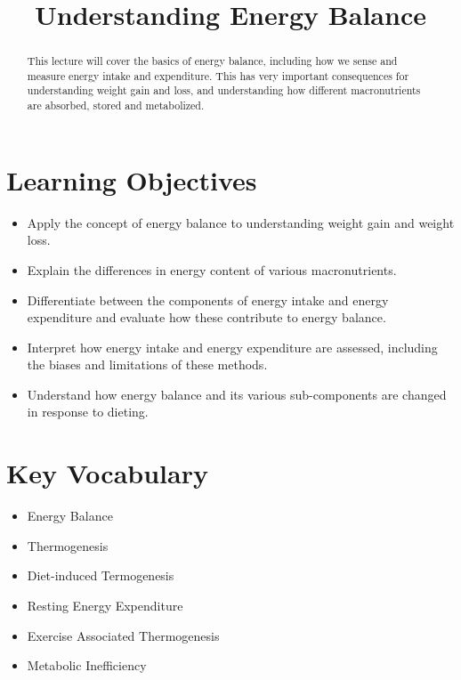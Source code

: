 \documentclass{tufte-handout}
\title{Understanding Energy Balance}
\author{}
\date{}  %
\begin{document}
\maketitle%

\begin{abstract}
\noindent This lecture will cover the basics of energy balance, including how we sense and measure energy intake and expenditure.  This has very important consequences for understanding weight gain and loss, and understanding how different macronutrients are absorbed, stored and metabolized.
\end{abstract}

\tableofcontents

\pagebreak
\section{Learning Objectives}

\begin{itemize}
\item Apply the concept of energy balance to understanding weight gain and weight loss.
\item Explain the differences in energy content of various macronutrients.
\item Differentiate between the components of energy intake and energy expenditure and evaluate how these contribute to energy balance.
\item Interpret how energy intake and energy expenditure are assessed, including the biases and limitations of these methods.
\item Understand how energy balance and its various sub-components are changed in response to dieting.

\end{itemize}

\section{Key Vocabulary}
\begin{itemize}
	\item Energy Balance
	\item Thermogenesis
	\item Diet-induced Termogenesis
	\item Resting Energy Expenditure
	\item Exercise Associated Thermogenesis
	\item Metabolic Inefficiency

\end{itemize}
\end{document}
